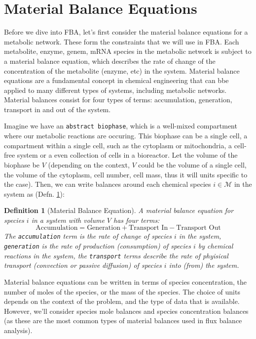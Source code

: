 \documentclass{article}[11pt]
\newtheorem{defn}{Definition}
\begin{document}
\section{Material Balance Equations}
Before we dive into FBA, let's first consider the material balance equations for a metabolic network. 
These form the constraints that we will use in FBA.
Each metabolite, enzyme, genem, mRNA species in the metabolic network is subject to a material balance equation, which describes the rate of change of the concentration of the metabolite (enzyme, etc) in the system.
Material balance equations are a fundamental concept in chemical engineering that can bbe applied to many different types of systems, including metabolic networks.
Material balances consist for four types of terms: accumulation, generation, transport in and out of the system.

Imagine we have an \texttt{abstract biophase}, which is a well-mixed compartment where our metabolic reactions are occuring.
This biophase can be a single cell, a compartment within a single cell, such as the cytoplasm or mitochondria, a cell-free system or a even collection of cells in 
a bioreactor. Let the volume of the biophase be $V$ (depending on the context, $V$ could be the volume of a single cell, the volume of the cytoplasm, cell number, cell mass, thus it will units specific to the case).
Then, we can write balances around each chemical species $i\in\mathcal{M}$ in the system as (Defn. \ref{defn-material-balance}):

\begin{mdframed}
\begin{defn}[Material Balance Equation]\label{defn-material-balance}
A material balance equation for species $i$ in a system with volume $V$ has four terms:
\begin{equation}\label{eqn-material-balance-words}
\text{Accumulation} = \text{Generation} + \text{Transport In} - \text{Transport Out}
\end{equation}
The \texttt{accumulation} term is the rate of change of species $i$ in the system, 
\texttt{generation} is the rate of production (consumption) of species $i$ by chemical reactions in the system,
the \texttt{transport} terms describe the rate of phyisical transport (convection or passive diffusion) of species $i$ into (from) the system.
\end{defn}
\end{mdframed}
Material balance equations can be written in terms of species concentration, the number of moles of the species, or the mass of the species.
The choice of units depends on the context of the problem, and the type of data that is available. 
However, we'll consider species mole balances and species concentration balances (as these are the most common types of material balances used in flux balance analysis).
\end{document}
